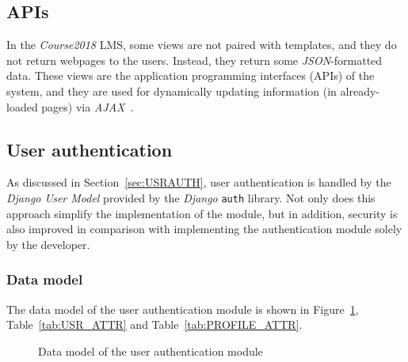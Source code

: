 








\subsection{APIs}
In the \emph{Course2018} LMS, some views are not paired with templates, and
they do not return webpages to the users.
Instead, they return some
\emph{JSON}-formatted data.
These views are the application programming interfaces (APIs) of the system,
and they are used for dynamically updating information (in already-loaded pages)
via \emph{AJAX}~\cite{AJAX}.



\subsection{User authentication}
As discussed in Section~\ref{sec:USRAUTH}, user authentication is handled by the
\emph{Django User Model} provided by the \emph{Django} \texttt{auth} library.
Not only does this approach simplify the implementation of the module,
but in addition, security is also improved in comparison with implementing the authentication
module solely by the developer.

\subsubsection{Data model}
The data model of the user authentication module is shown in
Figure~\ref{fig:AUTH_ER}, Table~\ref{tab:USR_ATTR} and
Table~\ref{tab:PROFILE_ATTR}.

\begin{figure}[ht]
    \centering

    \usetikzlibrary{er}

    \caption{Data model of the user authentication module}
    \label{fig:AUTH_ER}
\end{figure}


